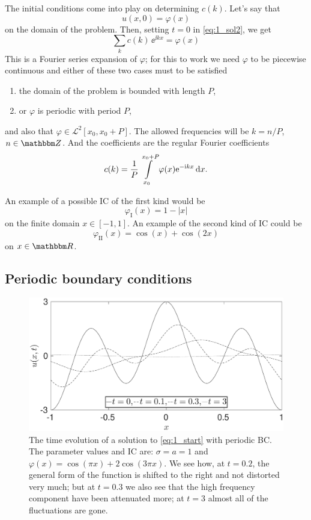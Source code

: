 \documentclass[11pt,letter, swedish, english
]{article}
\begin{document}
The initial conditions come into play on determining $c(k)$. Let's say
that
\begin{equation}
u(x, 0)=\varphi(x)
\end{equation}
on the domain of the problem. Then, setting $t=0$ in
\eqref{eq:1_sol2}, we get
\begin{equation}\label{eq:1_F-series}
\sum_k c(k)\, \ee^{\ii kx}=\varphi(x)
\end{equation}
This is a Fourier series expansion of $\varphi$; for this to work we
need $\varphi$ to be piecewise continuous and either of these two
cases must to be satisfied
\begin{enumerate}[label=\Roman*.]
\item the domain of the problem is bounded with length $P$,
\item or $\varphi$ is periodic with period $P$,
\end{enumerate}
and also that $\varphi\in\mathcal{L}^2[x_0, x_0+P]$.
The allowed frequencies will be $k=n/P$, $n\in\Z$.
And the coefficients are the regular Fourier coefficients
\begin{equation}
c(k)=\frac{1}{P}\int_{x_0}^{x_0+P} \varphi(x)\ee^{-\ii kx}\id{x}.
\end{equation}

An example of a possible IC of the first kind would be 
\begin{equation}
\varphi_\mathrm{I}(x)=1-|x|
\end{equation}
on the finite domain $x\in[-1, 1]$. An example of the second kind of
IC could be
\begin{equation}
\varphi_\mathrm{II}(x)=\cos(x)+\cos(2x)
\end{equation}
on $x\in\R$.


\subsection{Periodic boundary conditions}
\begin{figure}\centering
\includegraphics[width=.8\textwidth]{1_time_evolution.eps}
\caption{The time evolution of a solution to \eqref{eq:1_start} with
  periodic BC. The parameter values and IC are: $\sigma=a=1$ and 
  $\varphi(x)=\cos(\pi x)+2\cos(3\pi x)$. We see how, at $t=0.2$, the
  general form of the function is shifted to the right and not
  distorted very much; but at $t=0.3$ we also see that the high
  frequency component have been attenuated more; at $t=3$ almost all
  of the fluctuations are gone.}
\label{fig:1}
\end{figure}
\end{document}
